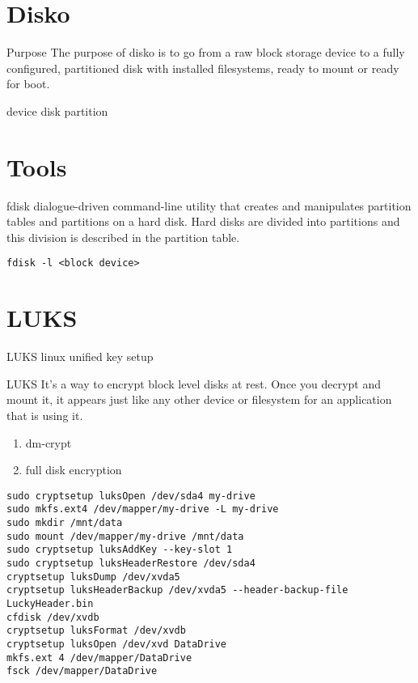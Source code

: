 \documentclass[openany, 12pt]{book}
\begin{document}
\chapter{Disko}
\begin{definition}{Purpose}{}
	The purpose of disko is to go from a raw block storage device to a fully
	configured, partitioned disk with installed filesystems, ready to mount or
	ready for boot.
\end{definition}

device
disk
partition

\chapter{Tools}
\begin{definition}{fdisk}{}
	dialogue-driven command-line utility that creates and manipulates partition
	tables and partitions on a hard disk. Hard disks are divided into partitions
	and this division is described in the partition table.
	\begin{verbatim}
fdisk -l <block device>
    \end{verbatim}
\end{definition}

\chapter{LUKS}
\begin{definition}{LUKS}{}
	linux unified key setup
\end{definition}

\begin{intuition}{LUKS}{}
	It's a way to encrypt block level disks at rest. Once you decrypt and mount
	it, it appears just like any other device or filesystem for an application
	that is using it.
\end{intuition}

\begin{enumerate}[label = {(\arabic*)}]
	\item dm-crypt
	\item full disk encryption
\end{enumerate}

\begin{verbatim}
sudo cryptsetup luksOpen /dev/sda4 my-drive
sudo mkfs.ext4 /dev/mapper/my-drive -L my-drive
sudo mkdir /mnt/data
sudo mount /dev/mapper/my-drive /mnt/data
sudo cryptsetup luksAddKey --key-slot 1
sudo cryptsetup luksHeaderRestore /dev/sda4
cryptsetup luksDump /dev/xvda5
cryptsetup luksHeaderBackup /dev/xvda5 --header-backup-file LuckyHeader.bin
cfdisk /dev/xvdb
cryptsetup luksFormat /dev/xvdb
cryptsetup luksOpen /dev/xvd DataDrive
mkfs.ext 4 /dev/mapper/DataDrive
fsck /dev/mapper/DataDrive
\end{verbatim}
\end{document}
